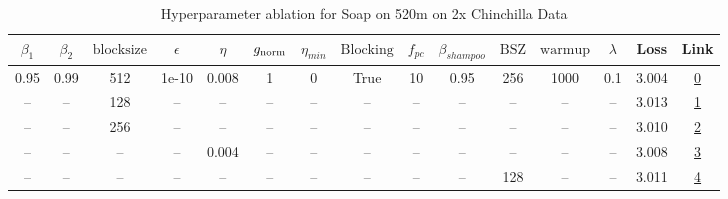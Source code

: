 \begin{table}[H]
\centering
\caption{Hyperparameter ablation for Soap on 520m on 2x Chinchilla Data}
\label{tab:ablation_soap_520m_on_2x_chinchilla_data}
\begin{tabular}{ccccccccccccccc}
\toprule
$\beta_1$ & $\beta_2$ & $\mathrm{block size}$ & $\epsilon$ & $\eta$ & $g_{\mathrm{norm}}$ & $\eta_{min}$ & $\mathrm{Blocking}$ & $f_{pc}$ & $\beta_{shampoo}$ & $\mathrm{BSZ}$ & $\mathrm{warmup}$ & $\lambda$ & Loss & Link \\
\midrule
0.95 & 0.99 & 512 & 1e-10 & 0.008 & 1 & 0 & True & 10 & 0.95 & 256 & 1000 & 0.1 & 3.004 & \href{https://wandb.ai/marin-community/optimizer-scaling/runs/sweep-520m-21B-soapea9baa74lr0.008-wd0.1-minlr0-warmup1000-b10.9-7994bc}{0} \\
\midrule
-- & -- & 128 & -- & -- & -- & -- & -- & -- & -- & -- & -- & -- & 3.013 & \href{https://wandb.ai/marin-community/optimizer-scaling/runs/sweep-520m-21B-soapeaf56540lr0.008-wd0.1-minlr0-warmup1000-b10.9-f05b1f}{1} \\
-- & -- & 256 & -- & -- & -- & -- & -- & -- & -- & -- & -- & -- & 3.010 & \href{https://wandb.ai/marin-community/optimizer-scaling/runs/sweep-520m-21B-soapea3d9681lr0.008-wd0.1-minlr0-warmup1000-b10.9-efedef}{2} \\
-- & -- & -- & -- & 0.004 & -- & -- & -- & -- & -- & -- & -- & -- & 3.008 & \href{https://wandb.ai/marin-community/optimizer-scaling/runs/sweep-520m-21B-soapea5a76ddlr0.004-wd0.1-minlr0-warmup1000-b10.9-f115eb}{3} \\
-- & -- & -- & -- & -- & -- & -- & -- & -- & -- & 128 & -- & -- & 3.011 & \href{https://wandb.ai/marin-community/optimizer-scaling/runs/sweep-520m-21B-soapeaef50b6lr0.008-wd0.1-minlr0-warmup1000-b10.9-8aed93}{4} \\
\bottomrule
\end{tabular}
\end{table}

